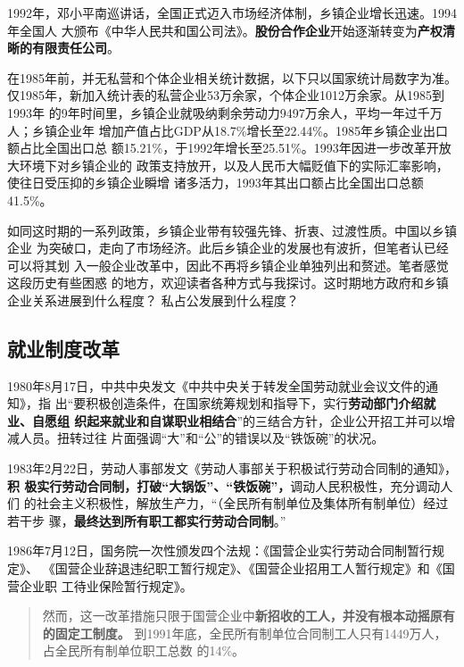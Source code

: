 1992年，邓小平南巡讲话，全国正式迈入市场经济体制，乡镇企业增长迅速。1994年全国人
大颁布《中华人民共和国公司法》。\textbf{股份合作企业}开始逐渐转变为\textbf{产权清
  晰的有限责任公司}。

在1985年前，并无私营和个体企业相关统计数据，以下只以国家统计局数字为准。
仅1985年，新加入统计表的私营企业53万余家，个体企业1012万余家。从1985到1993年
的9年时间里，乡镇企业就吸纳剩余劳动力9497万余人，平均一年过千万人；乡镇企业年
增加产值占比GDP从18.7\%增长至22.44\%。1985年乡镇企业出口额占比全国出口总
额15.21\%，于1992年增长至25.51\%。1993年因进一步改革开放大环境下对乡镇企业的
政策支持放开，以及人民币大幅贬值下的实际汇率影响，使往日受压抑的乡镇企业瞬增
诸多活力，1993年其出口额占比全国出口总额41.5\%。

如同这时期的一系列政策，乡镇企业带有较强先锋、折衷、过渡性质。中国以乡镇企业
为突破口，走向了市场经济。此后乡镇企业的发展也有波折，但笔者认已经可以将其划
入一般企业改革中，因此不再将乡镇企业单独列出和赘述。笔者感觉这段历史有些困惑
的地方，欢迎读者各种方式与我探讨。这时期地方政府和乡镇企业关系进展到什么程度？
私占公发展到什么程度？


\subsection{就业制度改革}

1980年8月17日，中共中央发文《中共中央关于转发全国劳动就业会议文件的通知》，指
出“要积极创造条件，在国家统筹规划和指导下，实行\textbf{劳动部门介绍就业、自愿组
  织起来就业和自谋职业相结合}”的三结合方针，企业公开招工并可以增减人员。扭转过往
片面强调“大”和“公”的错误以及“铁饭碗”的状况。

1983年2月22日，劳动人事部发文《劳动人事部关于积极试行劳动合同制的通知》，\textbf{积
  极实行劳动合同制，打破“大锅饭”、“铁饭碗”，}调动人民积极性，充分调动人们
的社会主义积极性，解放生产力，“（全民所有制单位及集体所有制单位）经过若干步
骤，\textbf{最终达到所有职工都实行劳动合同制}。”

1986年7月12日，国务院一次性颁发四个法规：《国营企业实行劳动合同制暂行规定》、
《国营企业辞退违纪职工暂行规定》、《国营企业招用工人暂行规定》和《国营企业职
工待业保险暂行规定》。
\begin{quotation}
  然而，这一改革措施只限于国营企业中\textbf{新招收的工人，并没有根本动摇原有的固定工制度。}
  到1991年底，全民所有制单位合同制工人只有1449万人，占全民所有制单位职工总数
  的14\%。\cite{laodongzhiduyuanfang}
\end{quotation}


